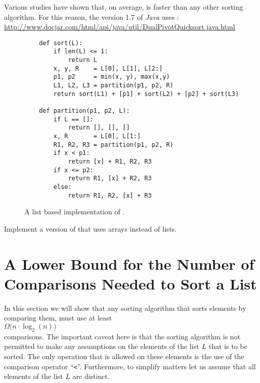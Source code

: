 \begin{enumerate}
      Various studies have shown that, on average,  is faster than any other sorting
      algorithm.  For this reason, the version 1.7 of \textsl{Java} uses :
      \\[0.2cm]
      \hspace*{0.3cm}
      \href{http://www.docjar.com/html/api/java/util/DualPivotQuicksort.java.html}{http://www.docjar.com/html/api/java/util/DualPivotQuicksort.java.html} 
\end{enumerate}

\begin{figure}[!ht]
\centering
\begin{verbatim}
    def sort(L):
        if len(L) <= 1:
            return L
        x, y, R    = L[0], L[1], L[2:]
        p1, p2     = min(x, y), max(x,y)
        L1, L2, L3 = partition(p1, p2, R)
        return sort(L1) + [p1] + sort(L2) + [p2] + sort(L3)
    
    def partition(p1, p2, L):
        if L == []:
            return [], [], []
        x, R       = L[0], L[1:]
        R1, R2, R3 = partition(p1, p2, R)
        if x < p1:
            return [x] + R1, R2, R3
        if x <= p2:
            return R1, [x] + R2, R3
        else:
            return R1, R2, [x] + R3
\end{verbatim}
\vspace*{-0.3cm}
\caption{A list based implementation of .}
\label{fig:dual-pivot-quick-sort.stlx}
\end{figure}

\exercise
Implement a version of  that uses arrays instead of lists.
\pagebreak

\section[A Lower Bound]{A Lower Bound for the Number of Comparisons Needed to Sort a List}
In this section we will show that any sorting algorithm that sorts elements by comparing them, must
use at least 
\\[0.2cm]
\hspace*{1.3cm}
 $\Omega\bigl(n \cdot \log_2(n)\bigr)$ 
\\[0.2cm]
comparisons.  The important caveat here is that the sorting algorithm is not permitted to make any assumptions
on the elements of the list $L$ that is to be sorted.  The only operation that is allowed on these
elements is the use of the comparison operator ``\texttt{<}''.  Furthermore, to simplify matters let
us assume that all elements of the list $L$ are distinct.


